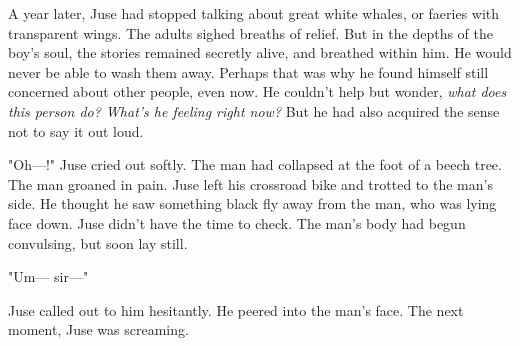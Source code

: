 A year later, Juse had stopped talking about great white whales, or
faeries with transparent wings. The adults sighed breaths of relief. But
in the depths of the boy's soul, the stories remained secretly alive,
and breathed within him. He would never be able to wash them away.
Perhaps that was why he found himself still concerned about other
people, even now. He couldn't help but wonder, \emph{what does this person do?
What's he feeling right now?} But he had also acquired the sense not to
say it out loud.

"Oh---!" Juse cried out softly. The man had collapsed at the foot of a
beech tree. The man groaned in pain. Juse left his crossroad bike and
trotted to the man's side. He thought he saw something black fly away
from the man, who was lying face down. Juse didn't have the time to
check. The man's body had begun convulsing, but soon lay still.

"Um--- sir---"

Juse called out to him hesitantly. He peered into the man's face. The
next moment, Juse was screaming.